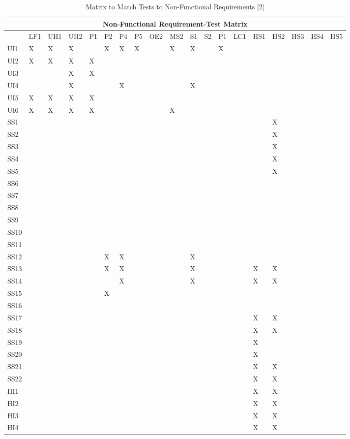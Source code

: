 \documentclass[11pt]{article}
\begin{document}
\begin{table}[H]
\centering
\caption{Matrix to Match Tests to Non-Functional Requirements [2]}
\label{label4}
\begin{tabular}{| l | l | l | l | l | l | l | l | l | l | l | l | l | l | l | l | l | l | l |}
\hline
\multicolumn{19}{|c|}{\textbf{Non-Functional Requirement-Test Matrix}}                          \\ \hline
 & \tiny{LF1} & \tiny{UH1} & \tiny{UH2} & \tiny{P1} & \tiny{P2} & \tiny{P4} & \tiny{P5} & \tiny{OE2} & \tiny{MS2} & \tiny{S1} & \tiny{S2} & \tiny{P1} & \tiny{LC1} & \tiny{HS1} & \tiny{HS2} & \tiny{HS3} & \tiny{HS4} & \tiny{HS5} \\ \hline
UI1&X&X&X&&X&X&X&&X&X&&X&&&&&& \\ \hline
UI2&X&X&X&X&&&&&&&&&&&&&& \\ \hline
UI3&&&X&X&&&&&&&&&&&&&& \\ \hline
UI4&&&X&&&X&&&&X&&&&&&&& \\ \hline
UI5&X&X&X&X&&&&&&&&&&&&&& \\ \hline
UI6&X&X&X&X&&&&&X&&&&&&&&& \\ \hline
SS1&&&&&&&&&&&&&&&X&&& \\ \hline
SS2&&&&&&&&&&&&&&&X&&& \\ \hline
SS3&&&&&&&&&&&&&&&X&&& \\ \hline
SS4&&&&&&&&&&&&&&&X&&& \\ \hline
SS5&&&&&&&&&&&&&&&X&&& \\ \hline
SS6&&&&&&&&&&&&&&&&&& \\ \hline
SS7&&&&&&&&&&&&&&&&&& \\ \hline
SS8&&&&&&&&&&&&&&&&&& \\ \hline
SS9&&&&&&&&&&&&&&&&&& \\ \hline
SS10&&&&&&&&&&&&&&&&&& \\ \hline
SS11&&&&&&&&&&&&&&&&&& \\ \hline
SS12&&&&&X&X&&&&X&&&&&&&& \\ \hline
SS13&&&&&X&X&&&&X&&&&X&X&&& \\ \hline
SS14&&&&&&X&&&&X&&&&X&X&&& \\ \hline
SS15&&&&&X&&&&&&&&&&&&& \\ \hline
SS16&&&&&&&&&&&&&&&&&& \\ \hline
SS17&&&&&&&&&&&&&&X&X&&& \\ \hline
SS18&&&&&&&&&&&&&&X&X&&& \\ \hline
SS19&&&&&&&&&&&&&&X&&&& \\ \hline
SS20&&&&&&&&&&&&&&X&&&& \\ \hline
SS21&&&&&&&&&&&&&&X&X&&& \\ \hline
SS22&&&&&&&&&&&&&&X&X&&& \\ \hline
HI1&&&&&&&&&&&&&&X&X&&& \\ \hline
HI2&&&&&&&&&&&&&&X&X&&& \\ \hline
HI3&&&&&&&&&&&&&&X&X&&& \\ \hline
HI4&&&&&&&&&&&&&&X&X&&& \\ \hline
\end{tabular}
\end{table}
\end{document}
